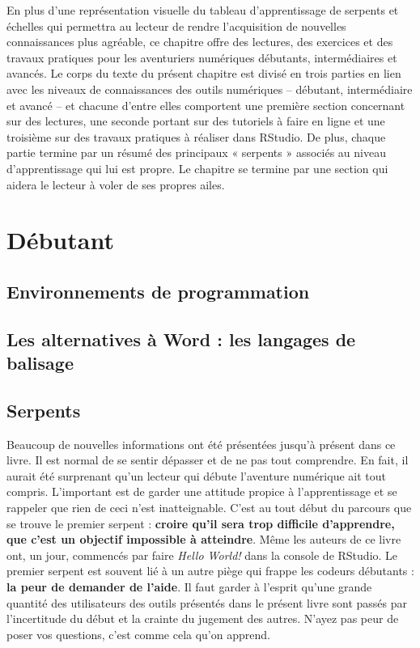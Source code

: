 \documentclass[
  letterpaper,
]{scrbook}
\begin{document}
En plus d'une représentation visuelle du tableau d'apprentissage de
serpents et échelles qui permettra au lecteur de rendre l'acquisition de
nouvelles connaissances plus agréable, ce chapitre offre des lectures,
des exercices et des travaux pratiques pour les aventuriers numériques
débutants, intermédiaires et avancés. Le corps du texte du présent
chapitre est divisé en trois parties en lien avec les niveaux de
connaissances des outils numériques -- débutant, intermédiaire et avancé
-- et chacune d'entre elles comportent une première section concernant
sur des lectures, une seconde portant sur des tutoriels à faire en ligne
et une troisième sur des travaux pratiques à réaliser dans RStudio. De
plus, chaque partie termine par un résumé des principaux « serpents »
associés au niveau d'apprentissage qui lui est propre. Le chapitre se
termine par une section qui aidera le lecteur à voler de ses propres
ailes.

\hypertarget{duxe9butant}{%
\section{Débutant}\label{duxe9butant}}

\hypertarget{environnements-de-programmation}{%
\subsection{Environnements de
programmation}\label{environnements-de-programmation}}

\hypertarget{les-alternatives-uxe0-word-les-langages-de-balisage}{%
\subsection{Les alternatives à Word : les langages de
balisage}\label{les-alternatives-uxe0-word-les-langages-de-balisage}}

\hypertarget{serpents}{%
\subsection{Serpents}\label{serpents}}

Beaucoup de nouvelles informations ont été présentées jusqu'à présent
dans ce livre. Il est normal de se sentir dépasser et de ne pas tout
comprendre. En fait, il aurait été surprenant qu'un lecteur qui débute
l'aventure numérique ait tout compris. L'important est de garder une
attitude propice à l'apprentissage et se rappeler que rien de ceci n'est
inatteignable. C'est au tout début du parcours que se trouve le premier
serpent : \textbf{croire qu'il sera trop difficile d'apprendre, que
c'est un objectif impossible à atteindre}. Même les auteurs de ce livre
ont, un jour, commencés par faire \emph{Hello World!} dans la console de
RStudio. Le premier serpent est souvent lié à un autre piège qui frappe
les codeurs débutants : \textbf{la peur de demander de l'aide}. Il faut
garder à l'esprit qu'une grande quantité des utilisateurs des outils
présentés dans le présent livre sont passés par l'incertitude du début
et la crainte du jugement des autres. N'ayez pas peur de poser vos
questions, c'est comme cela qu'on apprend.
\end{document}
